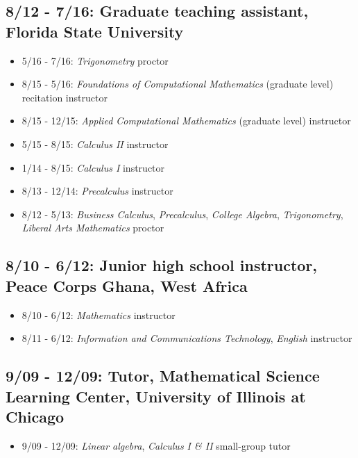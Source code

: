 \documentclass[11pt]{cv}
\begin{document}
\subsection*{8/12 - 7/16: Graduate teaching assistant, Florida State University}
\label{sec:orgheadline12}
\begin{itemize}
\item 5/16 - 7/16: \emph{Trigonometry} proctor\\
\item 8/15 - 5/16: \emph{Foundations of Computational Mathematics} (graduate level) recitation instructor\\
\item 8/15 - 12/15: \emph{Applied Computational Mathematics} (graduate level) instructor\\
\item 5/15 - 8/15: \emph{Calculus II} instructor\\
\item 1/14 - 8/15: \emph{Calculus I} instructor\\
\item 8/13 - 12/14: \emph{Precalculus} instructor\\
\item 8/12 - 5/13: \emph{Business Calculus}, \emph{Precalculus}, \emph{College Algebra}, \emph{Trigonometry}, \emph{Liberal Arts Mathematics} proctor\\
\end{itemize}
\subsection*{8/10 - 6/12: Junior high school instructor, Peace Corps Ghana, West Africa}
\label{sec:orgheadline13}
\begin{itemize}
\item 8/10 - 6/12: \emph{Mathematics} instructor\\
\item 8/11 - 6/12: \emph{Information and Communications Technology}, \emph{English} instructor\\
\end{itemize}
\subsection*{9/09 - 12/09: Tutor, Mathematical Science Learning Center, University of Illinois at Chicago}
\label{sec:orgheadline14}
\begin{itemize}
\item 9/09 - 12/09: \emph{Linear algebra}, \emph{Calculus I \& II} small-group tutor\\
\end{itemize}
\end{document}

